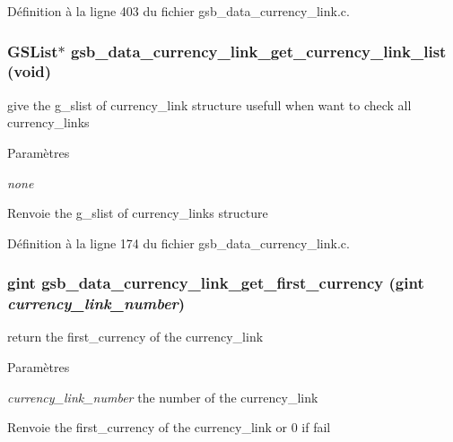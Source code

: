 Définition à la ligne 403 du fichier gsb\_\-data\_\-currency\_\-link.c.

\subsubsection[{gsb\_\-data\_\-currency\_\-link\_\-get\_\-currency\_\-link\_\-list}]{\setlength{\rightskip}{0pt plus 5cm}GSList$\ast$ gsb\_\-data\_\-currency\_\-link\_\-get\_\-currency\_\-link\_\-list (void)}\label{gsb__data__currency__link_8h_afabcb6dbde8dd4e991d69acf4c515ff6}
give the g\_\-slist of currency\_\-link structure usefull when want to check all currency\_\-links


\begin{DoxyParams}{Paramètres}
\item[{\em none}]\end{DoxyParams}
\begin{DoxyReturn}{Renvoie}
the g\_\-slist of currency\_\-links structure 
\end{DoxyReturn}


Définition à la ligne 174 du fichier gsb\_\-data\_\-currency\_\-link.c.

\subsubsection[{gsb\_\-data\_\-currency\_\-link\_\-get\_\-first\_\-currency}]{\setlength{\rightskip}{0pt plus 5cm}gint gsb\_\-data\_\-currency\_\-link\_\-get\_\-first\_\-currency (gint {\em currency\_\-link\_\-number})}\label{gsb__data__currency__link_8h_a2591e4c674d78df9749c4b3550102a9c}
return the first\_\-currency of the currency\_\-link


\begin{DoxyParams}{Paramètres}
\item[{\em currency\_\-link\_\-number}]the number of the currency\_\-link\end{DoxyParams}
\begin{DoxyReturn}{Renvoie}
the first\_\-currency of the currency\_\-link or 0 if fail 
\end{DoxyReturn}


